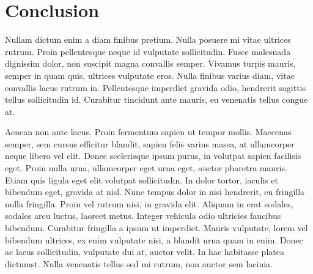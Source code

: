 \documentclass{article}
\begin{document}
\section{Conclusion}

Nullam dictum enim a diam finibus pretium. Nulla posuere mi vitae ultrices rutrum. Proin pellentesque neque id vulputate sollicitudin. Fusce malesuada dignissim dolor, non suscipit magna convallis semper. Vivamus turpis mauris, semper in quam quis, ultrices vulputate eros. Nulla finibus varius diam, vitae convallis lacus rutrum in. Pellentesque imperdiet gravida odio, hendrerit sagittis tellus sollicitudin id. Curabitur tincidunt ante mauris, eu venenatis tellus congue at.

Aenean non ante lacus. Proin fermentum sapien ut tempor mollis. Maecenas semper, sem cursus efficitur blandit, sapien felis varius massa, at ullamcorper neque libero vel elit. Donec scelerisque ipsum purus, in volutpat sapien facilisis eget. Proin nulla urna, ullamcorper eget urna eget, auctor pharetra mauris. Etiam quis ligula eget elit volutpat sollicitudin. In dolor tortor, iaculis et bibendum eget, gravida at nisl. Nunc tempus dolor in nisi hendrerit, eu fringilla nulla fringilla. Proin vel rutrum nisi, in gravida elit. Aliquam in erat sodales, sodales arcu luctus, laoreet metus. Integer vehicula odio ultricies faucibus bibendum. Curabitur fringilla a ipsum ut imperdiet. Mauris vulputate, lorem vel bibendum ultrices, ex enim vulputate nisi, a blandit urna quam in enim. Donec ac lacus sollicitudin, vulputate dui at, auctor velit. In hac habitasse platea dictumst. Nulla venenatis tellus sed mi rutrum, non auctor sem lacinia.
\end{document}
